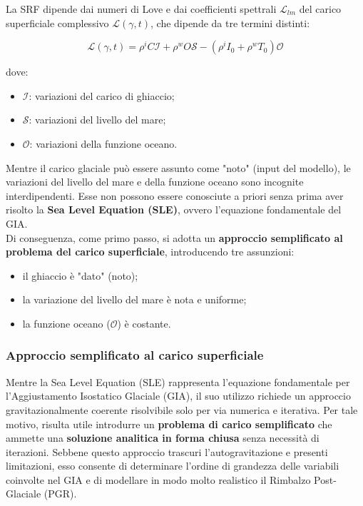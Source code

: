 \documentclass[a4paper,12pt]{book}
\begin{document}
\noindent La SRF dipende dai numeri di Love e dai coefficienti spettrali $\mathcal{L}_{lm}$ del carico superficiale complessivo $\mathcal{L}(\gamma,t)$, che dipende da tre termini distinti:

\begin{equation}
    \mathcal{L}(\gamma,t) = \rho^i C \mathcal{I} + \rho^w O \mathcal{S} - (\rho^i I_0 + \rho^w T_0) \mathcal{O}
\end{equation}

\noindent
dove:
\begin{itemize}
    \item $\mathcal{I}$: variazioni del carico di ghiaccio;
    \item $\mathcal{S}$: variazioni del livello del mare;
    \item $\mathcal{O}$: variazioni della funzione oceano.
\end{itemize}

\noindent
Mentre il carico glaciale può essere assunto come "noto" (input del modello),
le variazioni del livello del mare e della funzione oceano sono incognite interdipendenti.
Esse non possono essere conosciute a priori senza prima aver risolto la \textbf{Sea Level Equation (SLE)}, ovvero l'equazione fondamentale del GIA.\\

\noindent
Di conseguenza, come primo passo, si adotta un \textbf{approccio semplificato al problema del carico superficiale}, introducendo tre assunzioni:

\begin{itemize}
    \item il ghiaccio è "dato" (noto);
    \item la variazione del livello del mare è nota e uniforme;
    \item la funzione oceano ($\mathcal{O}$) è costante.
\end{itemize}

\subsubsection{\textcolor{colore7}{Approccio semplificato al carico superficiale}}

Mentre la Sea Level Equation (SLE) rappresenta l'equazione fondamentale per l'Aggiustamento Isostatico Glaciale (GIA), il suo utilizzo richiede un approccio gravitazionalmente coerente risolvibile solo per via numerica e iterativa. Per tale motivo, risulta utile introdurre un \textbf{problema di carico semplificato} che ammette una \textbf{soluzione analitica in forma chiusa} senza necessità di iterazioni. 
Sebbene questo approccio trascuri l'autogravitazione e presenti limitazioni, esso consente di determinare l'ordine di grandezza delle variabili coinvolte nel GIA e di modellare in modo molto realistico il Rimbalzo Post-Glaciale (PGR).\\
\end{document}
